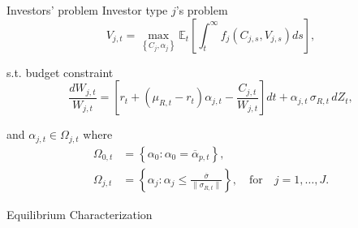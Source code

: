 \documentclass[12pt,aspectratio=169]{beamer}
\newenvironment{transitionframe}{
	\setbeamercolor{background canvas}{bg=mDarkBrown}
	\begin{frame}[plain, noframenumbering]}{
	\end{frame}
}
\begin{document}
\begin{frame}{Investors' problem}
Investor type $j$'s problem
    \[V_{j, t}=\max _{\left\lbrace C_{j}, \alpha_{j}\right\rbrace} \mathbb{E}_{t}\left[\int_{t}^{\infty} f_{j}\left(C_{j, s}, V_{j, s}\right) d s\right],\]

\medskip
s.t. budget constraint
    \[\frac{d W_{j, t}}{W_{j, t}}=\left[r_{t} +\left(\mu_{R, t}-r_{t}\right) \alpha_{j, t}-\frac{C_{j, t}}{W_{j, t}}\right] dt+\alpha_{j, t}\, \sigma_{R, t}\, d Z_{t},\]

\medskip
and $\alpha_{j,t}\in\Omega_{j,t}$ where 
\begin{align*}
    \Omega_{0, t}&=\left\{\alpha_{0}: \alpha_{0}=\overline{\alpha}_{p, t}\right\},\\
    \Omega_{j, t}&=\left\{\alpha_{j}: \alpha_{j} \leq \frac{\overline{\sigma}}{\| \sigma_{R, t }\|}\right\},\quad\text{for}\quad j=1, \ldots, J.
\end{align*}

\end{frame}

\begin{frame}[standout]
        Equilibrium Characterization
\end{frame}

\end{document}
